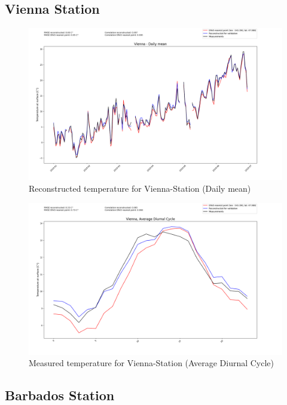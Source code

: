 \subsection*{Vienna Station}

\begin{figure}
    \centering
    \includegraphics[width=\textwidth]{resources/images/charts/vienna_eval_grib_final/Vienna - Daily mean.png}
    \caption{Reconstructed temperature for Vienna-Station (Daily mean)}
\end{figure}

\begin{figure}
    \centering
    \includegraphics[width=\textwidth]{resources/images/charts/vienna_eval_grib_final/Vienna, Average Diurnal Cycle.png}
    \caption{Measured temperature for Vienna-Station (Average Diurnal Cycle)}
\end{figure}

\newpage

\subsection*{Barbados Station}

